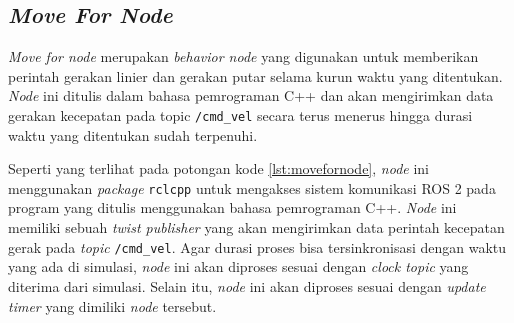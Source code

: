 \subsection{\emph{Move For Node}}
\label{subsec:movefornode}

\emph{Move for node} merupakan \emph{behavior node} yang digunakan untuk memberikan perintah gerakan linier dan gerakan putar selama kurun waktu yang ditentukan.
\emph{Node} ini ditulis dalam bahasa pemrograman C++ dan akan mengirimkan data gerakan kecepatan pada topic \lstinline{/cmd_vel} secara terus menerus hingga durasi waktu yang ditentukan sudah terpenuhi.



Seperti yang terlihat pada potongan kode \ref{lst:movefornode},
  \emph{node} ini menggunakan \emph{package} \lstinline{rclcpp} untuk mengakses sistem komunikasi ROS 2 pada program yang ditulis menggunakan bahasa pemrograman C++.
\emph{Node} ini memiliki sebuah \emph{twist publisher} yang akan mengirimkan data perintah kecepatan gerak pada \emph{topic} \lstinline{/cmd_vel}.
Agar durasi proses bisa tersinkronisasi dengan waktu yang ada di simulasi,
  \emph{node} ini akan diproses sesuai dengan \emph{clock topic} yang diterima dari simulasi.
Selain itu, \emph{node} ini akan diproses sesuai dengan \emph{update timer} yang dimiliki \emph{node} tersebut.
